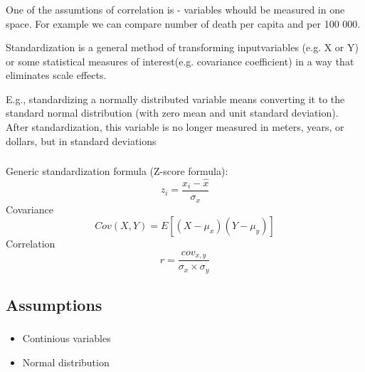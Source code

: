 \documentclass[t, 11pt]{beamer}
\begin{document}
				\begin{frame} 
		\frametitle{\insertsection} 	
	 One of the assumtions of correlation is  - variables whould be measured in one space. For example we can compare number of death per capita and per 100 000. 
	 
	 \vspace{0.5cm}
	 
	 Standardization is a general method of transforming inputvariables (e.g. X or Y) or some statistical measures of interest(e.g. covariance coefficient) in a way that eliminates scale effects.
	 	 
	 \vspace{0.5cm}
	 
	 E.g., standardizing a normally distributed variable means converting it to the standard normal distribution (with zero mean and unit standard deviation). After standardization, this variable is no longer measured in meters, years, or dollars, but in standard deviations
	 
	\end{frame}

				\begin{frame} 
	\frametitle{\insertsection} 	
		Generic standardization formula (Z-score formula):
		$$z_i = \frac{x_i- \hat{x}}{\sigma_x}$$
		Covariance
		$$Cov(X,Y) = E[(X-\mu_x)(Y-\mu_y)]$$
		Correlation
		$$r = \frac{cov_{x,y}}{\sigma_x \times \sigma_y}$$
	
\end{frame}
	


\subsection{Assumptions}


\begin{frame} 
	\frametitle{\insertsection} 	
	\framesubtitle{\insertsubsection} 	
	
	\begin{itemize}
		\item Continious variables
		\item Normal distribution
		\end{itemize}
	
\end{frame}
\end{document}
